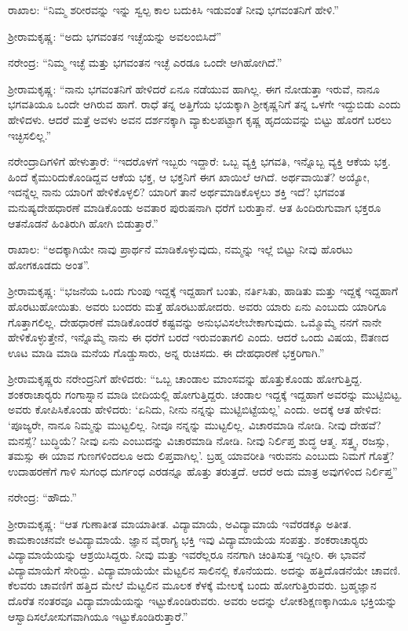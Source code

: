 ರಾಖಾಲ: “ನಿಮ್ಮ ಶರೀರವನ್ನು ಇನ್ನು ಸ್ವಲ್ಪ ಕಾಲ ಬದುಕಿಸಿ ಇಡುವಂತೆ ನೀವು ಭಗವಂತನಿಗೆ ಹೇಳಿ.”

ಶ‍್ರೀರಾಮಕೃಷ್ಣ: “ಅದು ಭಗವಂತನ ಇಚ್ಛೆಯನ್ನು ಅವಲಂಬಿಸಿದೆ”

ನರೇಂದ್ರ: “ನಿಮ್ಮ ಇಚ್ಛೆ ಮತ್ತು ಭಗವಂತನ ಇಚ್ಛೆ ಎರಡೂ ಒಂದೇ ಆಗಿಹೋಗಿದೆ.”

ಶ‍್ರೀರಾಮಕೃಷ್ಣ: “ನಾನು ಭಗವಂತನಿಗೆ ಹೇಳಿದರೆ ಏನೂ ನಡೆಯುವ ಹಾಗಿಲ್ಲ. ಈಗ ನೋಡುತ್ತಾ ಇರುವೆ, ನಾನೂ ಭಗವತಿಯೂ ಒಂದೇ ಆಗಿರುವ ಹಾಗೆ. ರಾಧೆ ತನ್ನ ಅತ್ತಿಗೆಯ ಭಯಕ್ಕಾಗಿ ಶ‍್ರೀಕೃಷ್ಣನಿಗೆ ತನ್ನ ಒಳಗೇ ಇದ್ದುಬಿಡು ಎಂದು ಹೇಳಿದಳು. ಆದರೆ ಮತ್ತೆ ಅವಳು ಅವನ ದರ್ಶನಕ್ಕಾಗಿ ವ್ಯಾಕುಲಪಟ್ಟಾಗ ಕೃಷ್ಣ ಹೃದಯವನ್ನು ಬಿಟ್ಟು ಹೊರಗೆ ಬರಲು ಇಚ್ಛಿಸಲಿಲ್ಲ.”

ನರೇಂದ್ರಾದಿಗಳಿಗೆ ಹೇಳುತ್ತಾರೆ: “ಇದರೊಳಗೆ ಇಬ್ಬರು ಇದ್ದಾರೆ: ಒಬ್ಬ ವ್ಯಕ್ತಿ ಭಗವತಿ, ಇನ್ನೊಬ್ಬ ವ್ಯಕ್ತಿ ಆಕೆಯ ಭಕ್ತ. ಹಿಂದೆ ಕೈಮುರಿದುಕೊಂಡಿದ್ದವ ಆಕೆಯ ಭಕ್ತ, ಆ ಭಕ್ತನಿಗೆ ಈಗ ಖಾಯಿಲೆ ಆಗಿದೆ. ಅರ್ಥವಾಯಿತೆ? ಅಯ್ಯೋ, ಇದನ್ನೆಲ್ಲ ನಾನು ಯಾರಿಗೆ ಹೇಳಿಕೊಳ್ಳಲಿ? ಯಾರಿಗೆ ತಾನೆ ಅರ್ಥಮಾಡಿಕೊಳ್ಳಲು ಶಕ್ತಿ ಇದೆ? ಭಗವಂತ ಮನುಷ್ಯದೇಹಧಾರಣೆ ಮಾಡಿಕೊಂಡು ಅವತಾರ ಪುರುಷನಾಗಿ ಧರೆಗೆ ಬರುತ್ತಾನೆ. ಆತ ಹಿಂದಿರುಗುವಾಗ ಭಕ್ತರೂ ಆತನೊಡನೆ ಹಿಂತಿರುಗಿ ಹೋಗಿ ಬಿಡುತ್ತಾರೆ.”

ರಾಖಾಲ: “ಅದಕ್ಕಾಗಿಯೇ ನಾವು ಪ್ರಾರ್ಥನೆ ಮಾಡಿಕೊಳ್ಳುವುದು, ನಮ್ಮನ್ನು ಇಲ್ಲೆ ಬಿಟ್ಟು ನೀವು ಹೊರಟು ಹೋಗಕೂಡದು ಅಂತ”.

ಶ‍್ರೀರಾಮಕೃಷ್ಣ: “ಭಜನೆಯ ಒಂದು ಗುಂಪು ಇದ್ದಕ್ಕೆ ಇದ್ದಹಾಗೆ ಬಂತು, ನರ್ತಿಸಿತು, ಹಾಡಿತು ಮತ್ತು ಇದ್ದಕ್ಕೆ ಇದ್ದಹಾಗೆ ಹೊರಟುಹೋಯಿತು. ಅವರು ಬಂದರು ಮತ್ತೆ ಹೊರಟುಹೋದರು. ಅವರು ಯಾರು ಏನು ಎಂಬುದು ಯಾರಿಗೂ ಗೊತ್ತಾಗಲಿಲ್ಲ. ದೇಹಧಾರಣೆ ಮಾಡಿಕೊಂಡರೆ ಕಷ್ಟವನ್ನು ಅನುಭವಿಸಲೇಬೇಕಾಗುವುದು. ಒಮ್ಮೊಮ್ಮೆ ನನಗೆ ನಾನೇ ಹೇಳಿಕೊಳ್ಳುತ್ತೇನೆ, ಇನ್ನೊಮ್ಮೆ ನಾನು ಈ ಧರೆಗೆ ಬರದೆ ಇರುವಂತಾಗಲಿ ಎಂದು. ಆದರೆ ಒಂದು ವಿಷಯ, ಔತಣದ ಊಟ ಮಾಡಿ ಮಾಡಿ ಮನೆಯ ಗೊಡ್ಡುಸಾರು, ಅನ್ನ ರುಚಿಸದು. ಈ ದೇಹಧಾರಣೆ ಭಕ್ತರಿಗಾಗಿ.”

ಶ‍್ರೀರಾಮಕೃಷ್ಣರು ನರೇಂದ್ರನಿಗೆ ಹೇಳಿದರು: “ಒಬ್ಬ ಚಾಂಡಾಲ ಮಾಂಸವನ್ನು ಹೊತ್ತುಕೊಂಡು ಹೋಗುತ್ತಿದ್ದ. ಶಂಕರಾಚಾರ‍್ಯರು ಗಂಗಾಸ್ನಾನ ಮಾಡಿ ಬೀದಿಯಲ್ಲಿ ಹೋಗುತ್ತಿದ್ದರು. ಚಂಡಾಲ ಇದ್ದಕ್ಕೆ ಇದ್ದಹಾಗೆ ಅವರನ್ನು ಮುಟ್ಟಿಬಿಟ್ಟ. ಅವರು ಕೋಪಿಸಿಕೊಂಡು ಹೇಳಿದರು: ‘ಏನಿದು, ನೀನು ನನ್ನನ್ನು ಮುಟ್ಟಿಬಿಟ್ಟೆಯಲ್ಲ’ ಎಂದು. ಅದಕ್ಕೆ ಆತ ಹೇಳಿದ: ‘ಪೂಜ್ಯರೇ, ನಾನೂ ನಿಮ್ಮನ್ನು ಮುಟ್ಟಲಿಲ್ಲ. ನೀವೂ ನನ್ನನ್ನು ಮುಟ್ಟಲಿಲ್ಲ. ವಿಚಾರಮಾಡಿ ನೋಡಿ. ನೀವು ದೇಹವೆ? ಮನಸ್ಸೆ? ಬುದ್ಧಿಯೆ? ನೀವು ಏನು ಎಂಬುದನ್ನು ವಿಚಾರಮಾಡಿ ನೋಡಿ. ನೀವು ನಿರ್ಲಿಪ್ತ ಶುದ್ಧ ಆತ್ಮ. ಸತ್ತ್ವ, ರಜಸ್ಸು, ತಮಸ್ಸು ಈ ಯಾವ ಗುಣಗಳಿಂದಲೂ ಅದು ಲಿಪ್ತವಾಗಿಲ್ಲ’. ಬ್ರಹ್ಮ ಯಾವರೀತಿ ಇರುವನು ಎಂಬುದು ನಿಮಗೆ ಗೊತ್ತೆ? ಉದಾಹರಣೆಗೆ ಗಾಳಿ ಸುಗಂಧ ದುರ್ಗಂಧ ಎರಡನ್ನೂ ಹೊತ್ತು ತರುತ್ತದೆ. ಆದರೆ ಅದು ಮಾತ್ರ ಅವುಗಳಿಂದ ನಿರ್ಲಿಪ್ತ”

ನರೇಂದ್ರ: “ಹೌದು.”

ಶ‍್ರೀರಾಮಕೃಷ್ಣ: “ಆತ ಗುಣಾತೀತ ಮಾಯಾತೀತ. ವಿದ್ಯಾಮಾಯೆ, ಅವಿದ್ಯಾಮಾಯೆ ಇವೆರಡಕ್ಕೂ ಅತೀತ. ಕಾಮಕಾಂಚನವೇ ಅವಿದ್ಯಾಮಾಯೆ. ಜ್ಞಾನ ವೈರಾಗ್ಯ ಭಕ್ತಿ ಇವು ವಿದ್ಯಾಮಾಯೆಯ ಸಂಪತ್ತು. ಶಂಕರಾಚಾರ‍್ಯರು ವಿದ್ಯಾಮಾಯೆಯನ್ನು ಆಶ್ರಯಿಸಿದ್ದರು. ನೀವು ಮತ್ತು ಇವರೆಲ್ಲರೂ ನನಗಾಗಿ ಚಿಂತಿಸುತ್ತ ಇದ್ದೀರಿ. ಈ ಭಾವನೆ ವಿದ್ಯಾಮಾಯೆಗೆ ಸೇರಿದ್ದು. ವಿದ್ಯಾಮಾಯೆಯೇ ಮೆಟ್ಟಲಿನ ಸಾಲಿನಲ್ಲಿ ಕೊನೆಯದು. ಅದನ್ನು ಹತ್ತಿದೊಡನೆಯೇ ಚಾವಣಿ. ಕೆಲವರು ಚಾವಣಿಗೆ ಹತ್ತಿದ ಮೇಲೆ ಮೆಟ್ಟಲಿನ ಮೂಲಕ ಕೆಳಕ್ಕೆ ಮೇಲಕ್ಕೆ ಬಂದು ಹೋಗುತ್ತಿರುವರು. ಬ್ರಹ್ಮಜ್ಞಾನ ದೊರೆತ ನಂತರವೂ ವಿದ್ಯಾಮಾಯೆಯನ್ನು ಇಟ್ಟುಕೊಂಡಿರುವರು. ಅವರು ಅದನ್ನು ಲೋಕಶಿಕ್ಷಣಕ್ಕಾಗಿಯೂ ಭಕ್ತಿಯನ್ನು ಆಸ್ವಾದಿಸಲೋಸುಗವಾಗಿಯೂ ಇಟ್ಟುಕೊಂಡಿರುತ್ತಾರೆ.”

